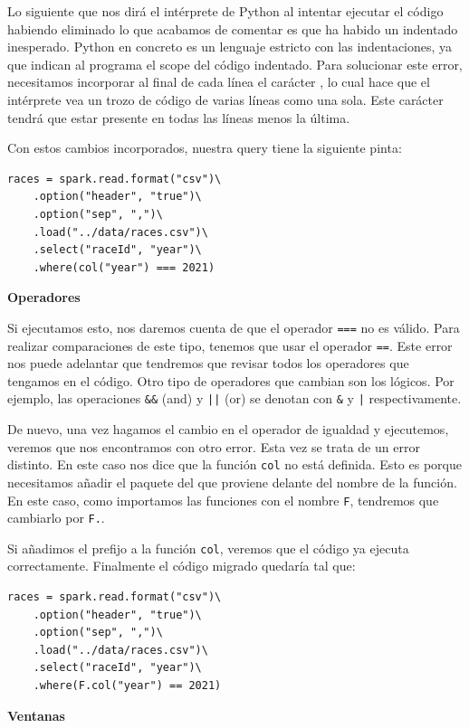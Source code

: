 \documentclass[12pt,twoside,titlepage]{report}
\begin{document}
Lo siguiente que nos dirá el intérprete de Python al intentar ejecutar el código habiendo eliminado lo que acabamos de comentar es que ha habido un indentado inesperado. Python en concreto es un lenguaje estricto con las indentaciones, ya que indican al programa el scope del código indentado. Para solucionar este error, necesitamos incorporar al final de cada línea el carácter \texttt{}, lo cual hace que el intérprete vea un trozo de código de varias líneas como una sola. Este carácter tendrá que estar presente en todas las líneas menos la última.

Con estos cambios incorporados, nuestra query tiene la siguiente pinta:

\begin{lstlisting}
races = spark.read.format("csv")\
	.option("header", "true")\
	.option("sep", ",")\
	.load("../data/races.csv")\
	.select("raceId", "year")\
	.where(col("year") === 2021)
\end{lstlisting}

\textbf{Operadores}

Si ejecutamos esto, nos daremos cuenta de que el operador \texttt{===} no es válido. Para realizar comparaciones de este tipo, tenemos que usar el operador \texttt{==}. Este error nos puede adelantar que tendremos que revisar todos los operadores que tengamos en el código. Otro tipo de operadores que cambian son los lógicos. Por ejemplo, las operaciones \texttt{\&\&} (and) y \texttt{||} (or) se denotan con \texttt{\&} y \texttt{|} respectivamente.

De nuevo, una vez hagamos el cambio en el operador de igualdad y ejecutemos, veremos que nos encontramos con otro error. Esta vez se trata de un error distinto. En este caso nos dice que la función \texttt{col} no está definida. Esto es porque necesitamos añadir el paquete del que proviene delante del nombre de la función. En este caso, como importamos las funciones con el nombre \texttt{F}, tendremos que cambiarlo por \texttt{F.}.

Si añadimos el prefijo a la función \texttt{col}, veremos que el código ya ejecuta correctamente. Finalmente el código migrado quedaría tal que:

\begin{lstlisting}
races = spark.read.format("csv")\
	.option("header", "true")\
	.option("sep", ",")\
	.load("../data/races.csv")\
	.select("raceId", "year")\
	.where(F.col("year") == 2021)
\end{lstlisting}

\textbf{Ventanas}
\end{document}
